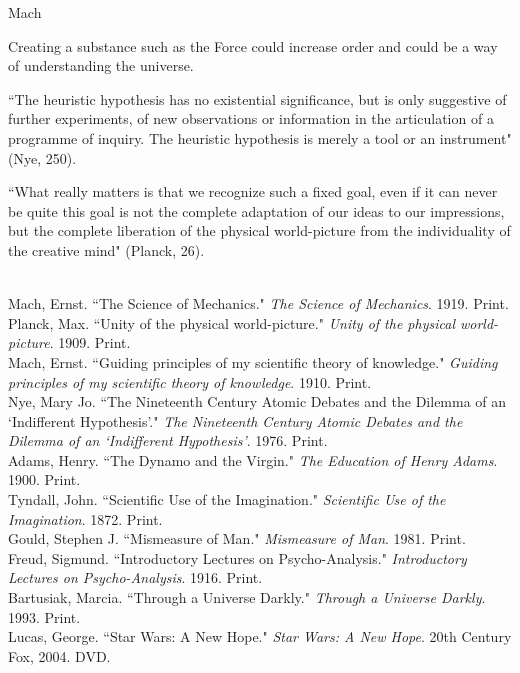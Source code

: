 \documentclass[11pt, oneside]{article}
\begin{document}
\par Mach

\par Creating a substance such as the Force could increase order and could be a way of understanding the universe.

\par ``The heuristic hypothesis has no existential significance, but is only suggestive of further experiments, of new observations or information in the articulation of a programme of inquiry. The heuristic hypothesis is merely a tool or an instrument" (Nye, 250).

\par ``What really matters is that we recognize such a fixed goal, even if it can never be quite this goal is not the complete adaptation of our ideas to our impressions, but the complete liberation of the physical world-picture from the individuality of the creative mind" (Planck, 26).

\begin{workscited}
\bibent \\
\bibent Mach, Ernst. ``The Science of Mechanics."  \textit{The Science of Mechanics}.  1919. Print. \\
\bibent Planck, Max. ``Unity of the physical world-picture."  \textit{Unity of the physical world-picture}.  1909. Print. \\
\bibent Mach, Ernst. ``Guiding principles of my scientific theory of knowledge."  \textit{Guiding principles of my scientific theory of knowledge}.  1910. Print. \\
\bibent Nye, Mary Jo. ``The Nineteenth Century Atomic Debates and the Dilemma of an `Indifferent Hypothesis'."  \textit{The Nineteenth Century Atomic Debates and the Dilemma of an `Indifferent Hypothesis'}.  1976. Print. \\
\bibent Adams, Henry.  ``The Dynamo and the Virgin."  \textit{The Education of Henry Adams}.  1900. Print. \\
\bibent Tyndall, John.  ``Scientific Use of the Imagination."  \textit{Scientific Use of the Imagination}.  1872. Print. \\
\bibent Gould, Stephen J.  ``Mismeasure of Man."  \textit{Mismeasure of Man}.  1981. Print. \\
\bibent Freud, Sigmund.  ``Introductory Lectures on Psycho-Analysis."  \textit{Introductory Lectures on Psycho-Analysis}.  1916. Print. \\
\bibent Bartusiak, Marcia.  ``Through a Universe Darkly."  \textit{Through a Universe Darkly}.  1993. Print. \\
\bibent Lucas, George. ``Star Wars: A New Hope."   \textit{Star Wars: A New Hope}. 20th Century Fox, 2004. DVD.
\end{workscited}
\end{document}
